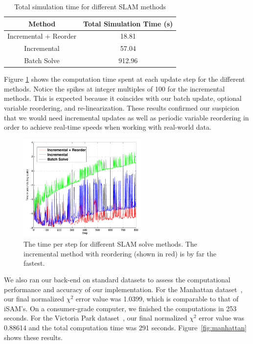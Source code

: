 \documentclass[conference]{IEEEtran}
\begin{document}
\begin{table}[!t]
\renewcommand{\arraystretch}{1.3}
\caption{Total simulation time for different \ac{SLAM} methods}
\label{tab:timing}
\centering
\begin{tabular}{|c|c|}
\hline
Method & Total Simulation Time (s) \\
\hline
Incremental + Reorder & 18.81 \\
Incremental & 57.04 \\
Batch Solve & 912.96 \\
\hline
\end{tabular}
\end{table}

Figure \ref{fig:stepTime} shows the computation time spent at each update step for the
different methods. Notice the spikes at integer multiples of 100 for the incremental
methods. This is expected because it coincides with our batch update, optional variable
reordering, and re-linearization. These results confirmed our suspicion that we would need
incremental updates as well as periodic variable reordering in order to achieve real-time
speeds when working with real-world data.

\begin{figure}[!t]
  \centering
  \includegraphics[width=2.5in]{images/stepTimeResults}
  \caption{The time per step for different \ac{SLAM} solve methods.  The incremental
    method with reordering (shown in red) is by far the fastest.}
  \label{fig:stepTime}
\end{figure}

We also ran our back-end on standard datasets to assess the computational performance and
accuracy of our implementation. For the Manhattan dataset~\cite{olson2006fast}, our final
normalized $\chi^2$ error value was 1.0399, which is comparable to that of iSAM's. On a
consumer-grade computer, we finished the computations in 253 seconds. For the Victoria
Park dataset~\cite{Guivant00autonomousnavigation}, our final normalized $\chi^2$ error
value was 0.88614 and the total computation time was 291 seconds.
Figure~\ref{fig:manhattan} shows these results.
\end{document}
